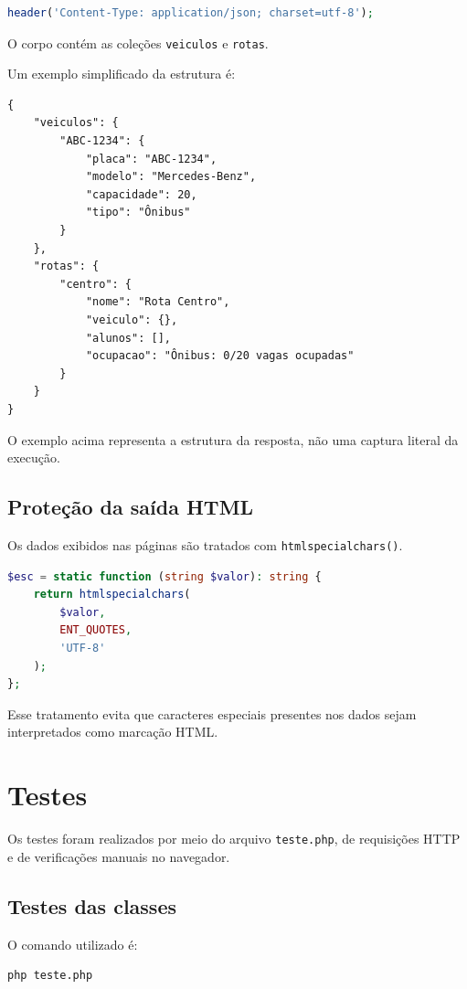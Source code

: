 \documentclass[12pt,a4paper]{article}
\begin{document}
\begin{lstlisting}[language=PHP]
header('Content-Type: application/json; charset=utf-8');
\end{lstlisting}

O corpo contém as coleções \texttt{veiculos} e \texttt{rotas}.

Um exemplo simplificado da estrutura é:

\begin{lstlisting}
{
    "veiculos": {
        "ABC-1234": {
            "placa": "ABC-1234",
            "modelo": "Mercedes-Benz",
            "capacidade": 20,
            "tipo": "Ônibus"
        }
    },
    "rotas": {
        "centro": {
            "nome": "Rota Centro",
            "veiculo": {},
            "alunos": [],
            "ocupacao": "Ônibus: 0/20 vagas ocupadas"
        }
    }
}
\end{lstlisting}

O exemplo acima representa a estrutura da resposta, não uma captura literal da execução.

\subsection{Proteção da saída HTML}

Os dados exibidos nas páginas são tratados com \texttt{htmlspecialchars()}.

\begin{lstlisting}[language=PHP]
$esc = static function (string $valor): string {
    return htmlspecialchars(
        $valor,
        ENT_QUOTES,
        'UTF-8'
    );
};
\end{lstlisting}

Esse tratamento evita que caracteres especiais presentes nos dados sejam interpretados como marcação HTML.

\section{Testes}

Os testes foram realizados por meio do arquivo \texttt{teste.php}, de requisições HTTP e de verificações manuais no navegador.

\subsection{Testes das classes}

O comando utilizado é:

\begin{lstlisting}
php teste.php
\end{lstlisting}
\end{document}
